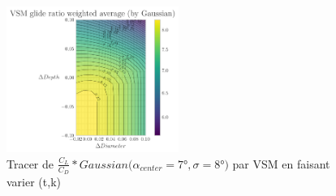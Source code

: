 \begin{figure}[H]
    \centering
    \includegraphics[width=0.5\textwidth]{Pics/02 - Le code/vsm.png}  
    \caption{Tracer de $\frac{C_L}{C_D} * Gaussian(\alpha_{center} = 7$°$, \sigma = 8$°$)$ par VSM en faisant varier (t,k)}
    \label{fig:vsm}
    \vspace{-1cm} %
\end{figure}